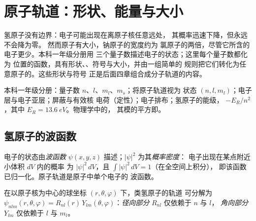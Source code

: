 \chapter{原子轨道：形状、能量与大小}\label{ch:b2:atomic-orbitals}

氢原子没有边界：电子可能出现在离原子核任意远处，
其概率迅速下降，但永远不会降为零。
然而原子有大小，钠原子的宽度约为
氯原子的两倍，尽管它所含的电子更少。本科一年级分册用
三个量子数描述电子的状态；这里每个量子数都化为
位置的函数，具有形状、、符号与大小，并由一组简单的
规则把它们转化为任意原子的。这些形状与符号
正是后面四章组合成分子轨道的内容。

\begin{recall}
本科一年级分册：量子数 $n$、$l$、$m_l$、$m_s$；将原子轨道视为
状态 $(n, l, m_l)$；电子层与电子亚层；屏蔽与有效核
电荷（定性）；电子排布；氢原子的能级，
$-E_R/n^2$，其中 $E_R = \qty{13.6}{eV}$。物理学中的，
其模的平方即。
\end{recall}

\section{氢原子的波函数}

\begin{definition}[波函数]\label{def:b2:atomic-orbitals:wavefunction}
电子的状态由\emph{波函数}
$\psi(x, y, z)$ 描述；$|\psi|^2$ 为其\emph{概率密度}：
电子出现在某点附近小体积 $dV$ 内的概率
为 $|\psi|^2\,dV$，且 $\int|\psi|^2\,dV = 1$（在全空间上积分），
即该函数已归一化。原子轨道是原子中单个电子的
波函数。
\end{definition}

\begin{definition}[径向部分与角向部分]\label{def:b2:atomic-orbitals:radial-angular}
在以原子核为中心的球坐标 $(r, \theta, \varphi)$ 下，类氢原子的轨道
可分解为 $\psi_{nlm}(r, \theta, \varphi) = R_{nl}(r)\,
Y_{lm}(\theta, \varphi)$：\emph{径向部分} $R_{nl}$ 仅依赖于 $n$ 与 $l$，
\emph{角向部分} $Y_{lm}$ 仅依赖于 $l$ 与
$m_l$。
\end{definition}

